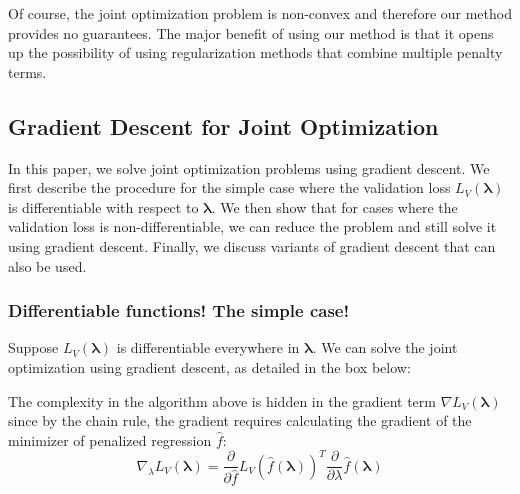 \documentclass[10pt,letterpaper]{article}
\begin{document}
Of course, the joint optimization problem is non-convex and therefore our method provides no guarantees. The major benefit of using our method is that it opens up the possibility of using regularization methods that combine multiple penalty terms.

\subsection{Gradient Descent for Joint Optimization}

In this paper, we solve joint optimization problems using gradient descent. We first describe the procedure for the simple case where the validation loss $L_V(\boldsymbol{\lambda})$ is differentiable with respect to $\boldsymbol{\lambda}$. We then show that for cases where the validation loss is non-differentiable, we can reduce the problem and still solve it using gradient descent. Finally, we discuss variants of gradient descent that can also be used.

\subsubsection{Differentiable functions! The simple case!}

Suppose $L_V(\boldsymbol{\lambda})$ is differentiable everywhere in $\boldsymbol{\lambda}$. We can solve the joint optimization using gradient descent, as detailed in the box below:

\begin{center}
\end{center}
The complexity in the algorithm above is hidden in the gradient term $\nabla{L_V}(\boldsymbol{\lambda})$ since by the chain rule, the gradient requires calculating the gradient of the minimizer of penalized regression $\hat f$:
\begin{equation}
\nabla_\lambda{L_V}(\boldsymbol{\lambda}) = \frac{\partial}{\partial \hat f}L_V(\hat f(\boldsymbol{\lambda}))^T \frac{\partial}{\partial \lambda} \hat f(\boldsymbol{\lambda})
\label{chainrule}
\end{equation}
\end{document}
